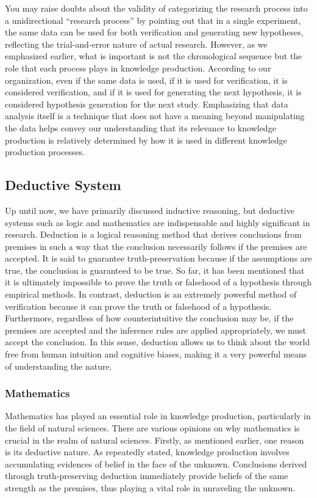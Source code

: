 \documentclass{book}
\begin{document}
You may raise doubts about the validity of categorizing the research process into a unidirectional ``research process'' by pointing out that in a single experiment, the same data can be used for both verification and generating new hypotheses, reflecting the trial-and-error nature of actual research. However, as we emphasized earlier, what is important is not the chronological sequence but the role that each process plays in knowledge production. According to our organization, even if the same data is used, if it is used for verification, it is considered verification, and if it is used for generating the next hypothesis, it is considered hypothesis generation for the next study. Emphasizing that data analysis itself is a technique that does not have a meaning beyond manipulating the data helps convey our understanding that its relevance to knowledge production is relatively determined by how it is used in different knowledge production processes.

\subsection{Deductive System}
Up until now, we have primarily discussed inductive reasoning, but deductive systems such as logic and mathematics are indispensable and highly significant in research. Deduction is a logical reasoning method that derives conclusions from premises in such a way that the conclusion necessarily follows if the premises are accepted. It is said to guarantee truth-preservation because if the assumptions are true, the conclusion is guaranteed to be true. So far, it has been mentioned that it is ultimately impossible to prove the truth or falsehood of a hypothesis through empirical methods. In contrast, deduction is an extremely powerful method of verification because it can prove the truth or falsehood of a hypothesis. Furthermore, regardless of how counterintuitive the conclusion may be, if the premises are accepted and the inference rules are applied appropriately, we must accept the conclusion. In this sense, deduction allows us to think about the world free from human intuition and cognitive biases, making it a very powerful means of understanding the nature.

\subsubsection{Mathematics}
Mathematics has played an essential role in knowledge production, particularly in the field of natural sciences. There are various opinions on why mathematics is crucial in the realm of natural sciences. Firstly, as mentioned earlier, one reason is its deductive nature. As repeatedly stated, knowledge production involves accumulating evidences of belief in the face of the unknown. Conclusions derived through truth-preserving deduction immediately provide beliefs of the same strength as the premises, thus playing a vital role in unraveling the unknown. 
\end{document}
